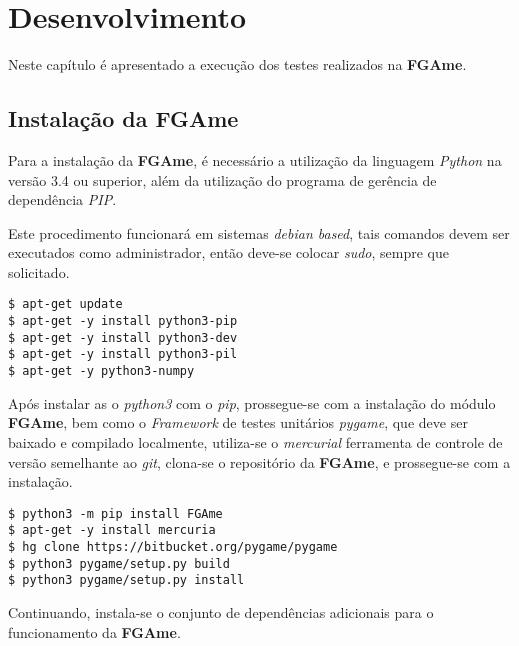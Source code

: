 \pagestyle{empty}

\chapter{Desenvolvimento}

Neste capítulo é apresentado a execução dos testes realizados na \textbf{FGAme}.

\section{Instalação da \textbf{FGAme}}
Para a instalação da \textbf{FGAme}, é necessário a utilização da linguagem \textit{Python} na versão 3.4 ou superior, além da utilização do programa de gerência de dependência \textit{PIP}.

Este procedimento funcionará em sistemas \textit{debian based}, tais comandos devem ser executados como administrador, então deve-se colocar \textit{sudo}, sempre que solicitado.

\begin{lstlisting}
$ apt-get update
$ apt-get -y install python3-pip
$ apt-get -y install python3-dev
$ apt-get -y install python3-pil
$ apt-get -y python3-numpy
\end{lstlisting}

Após instalar as o \textit{python3} com o \textit{pip}, prossegue-se com a instalação do módulo \textbf{FGAme}, bem como o \textit{Framework} de testes unitários \textit{pygame}, que deve ser baixado e compilado localmente, utiliza-se o \textit{mercurial} ferramenta de controle de versão semelhante ao \textit{git}, clona-se o repositório da \textbf{FGAme}, e prossegue-se com a instalação.

\begin{lstlisting}
$ python3 -m pip install FGAme
$ apt-get -y install mercuria
$ hg clone https://bitbucket.org/pygame/pygame
$ python3 pygame/setup.py build
$ python3 pygame/setup.py install
\end{lstlisting}

Continuando, instala-se o conjunto de dependências adicionais para o funcionamento da \textbf{FGAme}.

